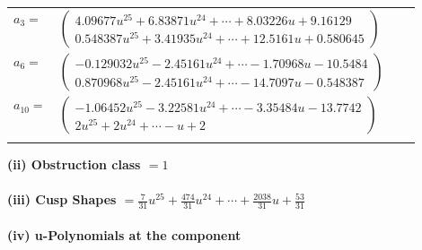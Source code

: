 \documentclass[1p]{elsarticle_modified}
\theoremstyle{definition}
\begin{document}
\begin{tabular}{m{7pt} m{180pt} m{7pt} m{180pt} }
\flushright $a_{3}=$&$\begin{pmatrix}4.09677 u^{25}+6.83871 u^{24}+\cdots+8.03226 u+9.16129\\0.548387 u^{25}+3.41935 u^{24}+\cdots+12.5161 u+0.580645\end{pmatrix}$ \\
\flushright $a_{6}=$&$\begin{pmatrix}-0.129032 u^{25}-2.45161 u^{24}+\cdots-1.70968 u-10.5484\\0.870968 u^{25}-2.45161 u^{24}+\cdots-14.7097 u-0.548387\end{pmatrix}$ \\
\flushright $a_{10}=$&$\begin{pmatrix}-1.06452 u^{25}-3.22581 u^{24}+\cdots-3.35484 u-13.7742\\2 u^{25}+2 u^{24}+\cdots- u+2\end{pmatrix}$\\&\end{tabular}
\flushleft \textbf{(ii) Obstruction class $= 1$}\\~\\
\flushleft \textbf{(iii) Cusp Shapes $= \frac{7}{31} u^{25}+\frac{474}{31} u^{24}+\cdots+\frac{2038}{31} u+\frac{53}{31}$}\\~\\
\newpage\renewcommand{\arraystretch}{1}
\flushleft \textbf{(iv) u-Polynomials at the component}\newline \\
\end{document}
